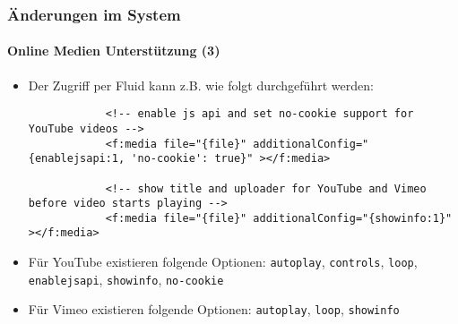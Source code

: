 
\begin{frame}[fragile]
	\frametitle{Änderungen im System}
	\framesubtitle{Online Medien Unterstützung (3)}

	\lstset{basicstyle=\tiny\ttfamily}

	\begin{itemize}

		\item Der Zugriff per Fluid kann z.B. wie folgt durchgeführt werden:

		\begin{lstlisting}
			<!-- enable js api and set no-cookie support for YouTube videos -->
			<f:media file="{file}" additionalConfig="{enablejsapi:1, 'no-cookie': true}" ></f:media>

			<!-- show title and uploader for YouTube and Vimeo before video starts playing -->
			<f:media file="{file}" additionalConfig="{showinfo:1}" ></f:media>
		\end{lstlisting}

		\item Für YouTube existieren folgende Optionen:\newline
			\small
				\texttt{autoplay}, \texttt{controls}, \texttt{loop}, \texttt{enablejsapi}, \texttt{showinfo}, \texttt{no-cookie}
			\normalsize
		\item Für Vimeo existieren folgende Optionen:\newline
			\small
				\texttt{autoplay}, \texttt{loop}, \texttt{showinfo}
			\normalsize
	\end{itemize}

\end{frame}


